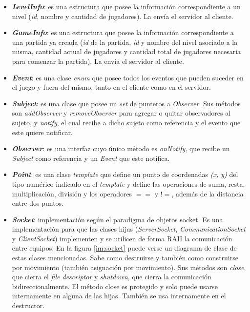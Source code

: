 \begin{itemize}
	\item \textbf{\textit{LevelInfo}}: es una estructura que posee la información correspondiente a un nivel (\textit{id}, nombre y cantidad de jugadores). La envía el servidor al cliente.

	\item \textbf{\textit{GameInfo}}: es una estructura que posee la información correspondiente a una partida ya creada (\textit{id} de la partida, \textit{id} y nombre del nivel asociado a la misma, cantidad actual de jugadores y cantidad total de jugadores necesaria para comenzar la partida). La envía el servidor al cliente.

	\item \textbf{\textit{Event}}: es una clase \textit{enum} que posee todos los eventos que pueden suceder en el juego y fuera del mismo, tanto en el cliente como en el servidor.

	\item \textbf{\textit{Subject}}: es una clase que posee un \textit{set} de punteros a \textit{Observer}. Sus métodos son \textit{addObserver} y \textit{removeObserver} para agregar o quitar observadores al sujeto, y \textit{notify}, el cual recibe a dicho sujeto como referencia y el evento que este quiere notificar.

	\item \textbf{\textit{Observer}}: es una interfaz cuyo único método es \textit{onNotify}, que recibe un \textit{Subject} como referencia y un \textit{Event} que este notifica.

	\item \textbf{\textit{Point}}: es una clase \textit{template} que define un punto de coordenadas \textit{(x, y)} del tipo numérico indicado en el \textit{template} y define las operaciones de suma, resta, multiplicación, división y los operadores $==$ y  $!=$, además de la distancia entre dos puntos.

	\item \textbf{\textit{Socket}}: implementación según el paradigma de objetos socket. Es una implementación para que las clases hijas (\emph{ServerSocket}, \emph{CommunicationSocket} y \emph{ClientSocket}) implementen y se utilicen de forma RAII la comunicación entre equipos. En la figura \ref{im:socket} puede verse un diagrama de clase de estas clases mencionadas. Sabe como destruirse y también como construirse por movimiento (también asignación por movimiento). Sus métodos son \textit{close}, que cierra el \textit{file descriptor} y \textit{shutdown}, que cierra la comunicación bidireccionalmente. El método close es protegido y solo puede usarse internamente en alguna de las hijas. También se usa internamente en el destructor.


\end{itemize}
